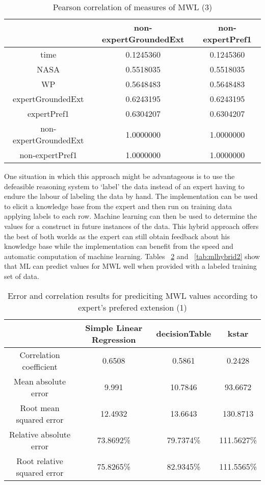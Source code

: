 \begin{table}[!htbp]
\centering
\begin{tabular}{|c|c|c|}
\hline
                 & non-expertGroundedExt & non-expertPref1 \\ \hline
time                & 0.1245360  & 0.1245360 \\
NASA                & 0.5518035  & 0.5518035 \\
WP                  & 0.5648483  & 0.5648483 \\
expertGroundedExt   & 0.6243195  & 0.6243195 \\
expertPref1         & 0.6304207  & 0.6304207 \\
non-expertGroundedExt & 1.0000000  & 1.0000000 \\
non-expertPref1       & 1.0000000  & 1.0000000 \\
\hline
\end{tabular}
\caption{Pearson correlation of measures of MWL (3)}
\label{tab:corrmwlthree}
\end{table}

One situation in which this approach might be advantageous is to use the defeasible reasoning system to `label' the data instead of an expert having to endure the labour of labeling the data by hand. The implementation can be used to elicit a knowledge base from the expert and then run on training data applying labels to each row. Machine learning can then be used to determine the values for a construct in future instances of the data. This hybrid approach offers the best of both worlds as the expert can still obtain feedback about his knowledge base while the implementation can benefit from the speed and automatic computation of machine learning. Tables ~\ref{tab:mlhybrid1} and ~\ref{tab:mlhybrid2} show that ML can predict values for MWL well when provided with a labeled training set of data.

\begin{table}[!htbp]
\centering
\begin{tabular}{|c|c|c|c|}
\hline
                            & Simple Linear Regression   & decisionTable  & kstar\\ \hline
Correlation coefficient     & 0.6508        & 0.5861         & 0.2428       \\
Mean absolute error         & 9.991        & 10.7846        & 93.6672       \\
Root mean squared error     & 12.4932      & 13.6643       & 130.8713       \\
Relative absolute error     & 73.8692\%    & 79.7374\%        & 111.5627\%  \\
Root relative squared error & 75.8265\%     & 82.9345\%      & 111.5565\%   \\
\hline
\end{tabular}
\caption{Error and correlation results for prediciting MWL values according to expert's prefered extension (1)}
\label{tab:mlhybrid1}
\end{table}


